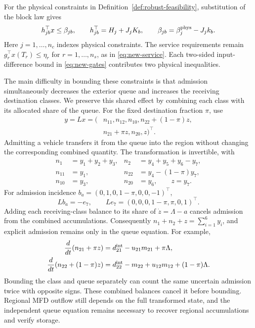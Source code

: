 \documentclass[preprint,12pt]{elsarticle}
\theoremstyle{definition}
\theoremstyle{plain}
\theoremstyle{definition}
\theoremstyle{plain}
\begin{document}
For the physical constraints in Definition~\ref{def:robust-feasibility},
substitution of the block law gives
\begin{equation}
 h_{jb}^\top x\le\beta_{jb},\qquad
 h_{jb}^\top=H_j+J_jK_b,\qquad
 \beta_{jb}=\beta_j^{\rm phys}-J_jk_b.
 \label{eq:new-physical-rows}
\end{equation}
Here $j=1,\ldots,n_c$ indexes physical constraints. The service
requirements remain $g_r^\top x(T_r)\le\eta_r$ for $r=1,\ldots,n_s$,
as in \eqref{eq:new-service}. Each two-sided input-difference bound in
\eqref{eq:new-gates} contributes two physical inequalities.

The main difficulty in bounding these constraints is that admission
simultaneously decreases the exterior queue and increases the receiving
destination classes. We preserve this shared effect by combining each
class with its allocated share of the queue. For the fixed destination
fraction $\pi$, use
\begin{equation}
\begin{aligned}
y=Lx=(&n_{11},n_{12},n_{10},n_{22}+(1-\pi)z,\\
      &n_{21}+\pi z,n_{20},z)^\top.
\end{aligned}
\label{eq:new-conservation-coordinates}
\end{equation}
Admitting a vehicle transfers it from the queue into the region without
changing the corresponding combined quantity. The transformation is
invertible, with
\begin{equation}
 \begin{aligned}
 n_1&=y_1+y_2+y_3,&n_2&=y_4+y_5+y_6-y_7,\\
 n_{11}&=y_1,&n_{22}&=y_4-(1-\pi)y_7,\\
 n_{10}&=y_3,&n_{20}&=y_6,\qquad z=y_7.
 \end{aligned}
 \label{eq:new-inverse-coordinates}
\end{equation}
For admission incidence $b_a=(0,1,0,1-\pi,0,0,-1)^\top$,
\begin{equation}
 Lb_a=-e_7,
 \qquad Le_7=(0,0,0,1-\pi,\pi,0,1)^\top.
 \label{eq:new-conservation-incidence}
\end{equation}
Adding each receiving-class balance to its share of
$\dot z=\Lambda-a$ cancels admission from the combined accumulations.
Consequently $n_1+n_2+z=\sum_{i=1}^6y_i$, and explicit admission remains
only in the queue equation. For example,
\[
\begin{aligned}
\frac{d}{dt}(n_{21}+\pi z)
 &=d_{21}^{\rm int}-u_{21}m_{21}+\pi\Lambda,\\
\frac{d}{dt}(n_{22}+(1-\pi)z)
 &=d_{22}^{\rm int}-m_{22}+u_{12}m_{12}+(1-\pi)\Lambda.
\end{aligned}
\]
Bounding the class and queue separately can count the same uncertain
admission twice with opposite signs. These combined balances cancel it
before bounding. Regional MFD outflow still depends on the full
transformed state, and the independent queue equation remains necessary
to recover regional accumulations and verify storage.
\end{document}
